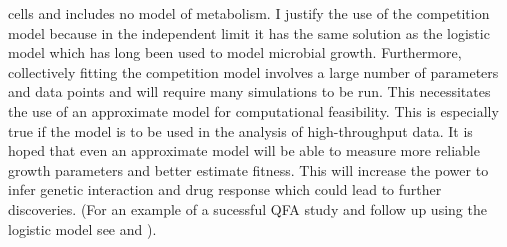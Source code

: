 cells and includes no model of metabolism. I justify the use of the
competition model because in the independent limit it has the same
solution as the logistic model which has long been used to model
microbial growth. Furthermore, collectively fitting the competition
model involves a large number of parameters and data points and will
require many simulations to be run. This necessitates the use of an
approximate model for computational feasibility. This is especially
true if the model is to be used in the analysis of high-throughput
data. It is hoped that even an approximate model will be able to
measure more reliable growth parameters and better estimate
fitness. This will increase the power to infer genetic interaction and
drug response which could lead to further discoveries. (For an example
of a sucessful QFA study and follow up using the logistic model see
\citet{Addinall2011} and \citet{Holstein20141259}).


